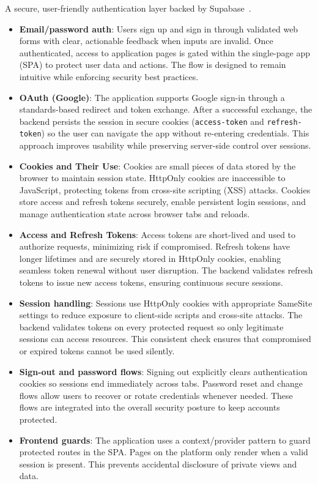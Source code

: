 \documentclass[12pt,a4paper]{article}
\begin{document}
A secure, user-friendly authentication layer backed by Supabase~\cite{supabase}.
\begin{itemize}
  \item \textbf{Email/password auth}: Users sign up and sign in through validated web forms with clear, actionable feedback when inputs are invalid. Once authenticated, access to application pages is gated within the single-page app (SPA) to protect user data and actions. The flow is designed to remain intuitive while enforcing security best practices.
  \item \textbf{OAuth (Google)}: The application supports Google sign-in through a standards-based redirect and token exchange. After a successful exchange, the backend persists the session in secure cookies (\texttt{access-token} and \texttt{refresh-token}) so the user can navigate the app without re-entering credentials. This approach improves usability while preserving server-side control over sessions.
  \item \textbf{Cookies and Their Use}: Cookies are small pieces of data stored by the browser to maintain session state. HttpOnly cookies are inaccessible to JavaScript, protecting tokens from cross-site scripting (XSS) attacks. Cookies store access and refresh tokens securely, enable persistent login sessions, and manage authentication state across browser tabs and reloads.
  \item \textbf{Access and Refresh Tokens}: Access tokens are short-lived and used to authorize requests, minimizing risk if compromised. Refresh tokens have longer lifetimes and are securely stored in HttpOnly cookies, enabling seamless token renewal without user disruption. The backend validates refresh tokens to issue new access tokens, ensuring continuous secure sessions.
  \item \textbf{Session handling}: Sessions use HttpOnly cookies with appropriate SameSite settings to reduce exposure to client-side scripts and cross-site attacks. The backend validates tokens on every protected request so only legitimate sessions can access resources. This consistent check ensures that compromised or expired tokens cannot be used silently.
  \item \textbf{Sign-out and password flows}: Signing out explicitly clears authentication cookies so sessions end immediately across tabs. Password reset and change flows allow users to recover or rotate credentials whenever needed. These flows are integrated into the overall security posture to keep accounts protected.
  \item \textbf{Frontend guards}: The application uses a context/provider pattern to guard protected routes in the SPA. Pages on the platform only render when a valid session is present. This prevents accidental disclosure of private views and data.

\end{itemize}
\end{document}
